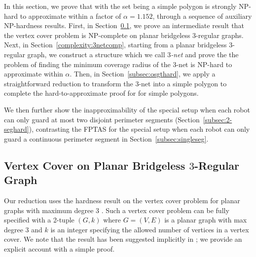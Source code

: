 In this section, we prove that \osgt with the set being a simple polygon is 
strongly NP-hard to approximate within a factor of $\alpha = 1.152$, through 
a sequence of auxiliary NP-hardness results. 
%
First, in Section~\ref{subsec:3regular}, we prove an intermediate result 
that the vertex cover problem is NP-complete on planar bridgeless 
$3$-regular graphs.
% 
Next, in Section~\ref{complexity:3netcomp}, starting from a planar bridgeless 
$3$-regular graph, we construct a structure which we call {\em $3$-net} and 
prove the the problem of finding the minimum coverage radius of the 
$3$-net is NP-hard to approximate within $\alpha$. 
% 
Then, in Section~\ref{subsec:osgthard}, we apply a straightforward 
reduction to transform the $3$-net into a simple polygon to complete
the hard-to-approximate proof for \osgt for simple polygons.
%

We then further show the inapproximability of the special \opgt setup 
when each robot can only guard at most two disjoint perimeter segments 
(Section~\ref{subsec:2-seghard}), contrasting the FPTAS for the special 
\opgt setup when each robot can only guard a continuous perimeter 
segment in Section~\ref{subsec:singleseg}.

\subsection{Vertex Cover on Planar Bridgeless $3$-Regular Graph}\label{subsec:3regular}
Our reduction uses the hardness result on the vertex cover problem for planar 
graphs with maximum degree $3$ \cite{garey1977rectilinear}. Such a vertex cover 
problem can be fully specified with a 2-tuple $(G, k)$ where $G = (V, E)$ is a 
planar graph with max degree $3$ and $k$ is an integer specifying the allowed 
number of vertices in a vertex cover. We note that the result has been 
suggested implicitly in \cite{mohar2001face}; we provide an explicit account 
with a simple proof. 

